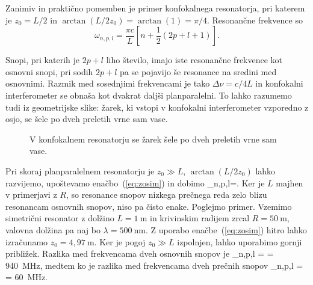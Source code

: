 Zanimiv in praktično pomemben je primer konfokalnega resonatorja,
pri katerem je $z_{0}=L/2$ in $\arctan(L/2z_{0})= \arctan(1)=\pi/4$. Resonančne frekvence
so 
\begin{equation}
\omega_{n,p,l}=\frac{\pi c}{L}\left[n+\frac{1}{2}(2p+l+1)\right].
\label{eq:omega_konf}
\end{equation}

Snopi, pri katerih je $2p+l$ liho število, imajo iste resonančne frekvence kot
osnovni snopi, pri sodih $2p+l$ pa se pojavijo še resonance na sredini
med osnovnimi. Razmik med sosednjimi frekvencami je tako $\Delta\nu=c/4L$
in konfokalni interferometer se obnaša kot dvakrat daljši planparalelni.
To lahko razumemo tudi iz geometrijske slike: žarek, ki vstopi v konfokalni
interferometer vzporedno z osjo, se šele po dveh preletih vrne sam
vase.

\begin{figure}[h]
\centering
\def\svgwidth{60truemm} 

\caption{V konfokalnem resonatorju se žarek šele po dveh preletih
vrne sam vase.}
\label{fig:Konfokalni_zarek}
\end{figure}

Pri skoraj planparalelnem 
resonatorju je $z_{0}\gg L$, $\arctan(L/2z_{0})$ lahko razvijemo, upoštevamo enačbo~(\ref{eq:zosim}) 
in dobimo
\beq
\omega_{n,p,l}=.
\eeq
Ker je $L$ majhen v primerjavi z $R$, so resonance snopov nizkega prečnega reda 
zelo blizu resonancam osnovnih snopov, niso pa čisto enake. Poglejmo primer. Vzemimo 
simetrični resonator z dolžino $L=1~\si{\metre}$ in krivinskim radijem zrcal $R=50~\si{\metre}$, 
valovna dolžina pa naj bo $\lambda= 500~\si{\nano\metre}$. Z uporabo enačbe~(\ref{eq:zosim})
hitro lahko izračunamo $z_0 = 4,97~\si{\metre}$. Ker je pogoj $z_0\gg L$ izpolnjen, lahko uporabimo
gornji približek. Razlika med frekvencama dveh osnovnih snopov je
\beq
\Delta \omega_{n,p,l} =  = 940~\si{\mega\hertz},
\eeq
medtem ko je razlika med frekvencama dveh prečnih snopov
\beq
\Delta \omega_{n,p,l} =   = 60~\si{\mega\hertz}.
\eeq

